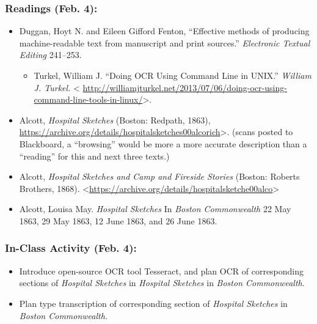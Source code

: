 \documentclass[]{article}
\begin{document}
\subsubsection{Readings (Feb. 4):}\label{readings-feb.-4}

\begin{itemize}
\itemsep1pt\parskip0pt
\item
  Duggan, Hoyt N. and Eileen Gifford Fenton, ``Effective methods of
  producing machine-readable text from manuscript and print sources.''
  \emph{Electronic Textual Editing} 241--253.

  \begin{itemize}
  \itemsep1pt\parskip0pt
  \item
    Turkel, William J. ``Doing OCR Using Command Line in UNIX.''
    \emph{William J. Turkel.} \textless{}
    \url{http://williamjturkel.net/2013/07/06/doing-ocr-using-command-line-tools-in-linux/}\textgreater{}.
  \end{itemize}
\item
  Alcott, \emph{Hospital Sketches} (Boston: Redpath, 1863),
  \url{https://archive.org/details/hospitalsketches00alcorich}\textgreater{}.
  (scans posted to Blackboard, a ``browsing'' would be more a more
  accurate description than a ``reading'' for this and next three
  texts.)
\item
  Alcott, \emph{Hospital Sketches and Camp and Fireside Stories}
  (Boston: Roberts Brothers, 1868).
  \textless{}\url{https://archive.org/details/hospitalsketche00alco}\textgreater{}
\item
  Alcott, Louisa May. \emph{Hospital Sketches} In \emph{Boston
  Commonwealth} 22 May 1863, 29 May 1863, 12 June 1863, and 26 June
  1863.
\end{itemize}

\subsubsection{In-Class Activity (Feb.
4):}\label{in-class-activity-feb.-4}

\begin{itemize}
\itemsep1pt\parskip0pt
\item
  Introduce open-source OCR tool Tesseract, and plan OCR of
  corresponding sections of \emph{Hospital Sketches} in \emph{Hospital
  Sketches} in \emph{Boston Commonwealth}.
\item
  Plan type transcription of corresponding section of \emph{Hospital
  Sketches} in \emph{Boston Commonwealth}.
\end{itemize}
\end{document}
